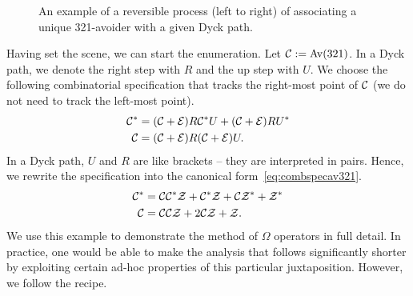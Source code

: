 \documentclass[12pt, a4paper, twoside]{report}
\begin{document}
\begin{figure}[!ht]
\begin{center}
\caption{\small{An example of a reversible process (left to right) of associating a unique 321-avoider with a given Dyck path.}}
\end{center}
\end{figure}

Having set the scene, we can start the enumeration. Let $\mathcal{C} := \mathrm{Av}(321)$. In a Dyck path, we denote the right step with $R$ and the up step with $U$. We choose the following combinatorial specification that tracks the right-most point of $\mathcal{C}$ (we do not need to track the left-most point). 
\begin{align*}
  \mathcal{C}^* &= (\mathcal{C} + \mathcal{E})R\mathcal{C}^*U + (\mathcal{C} + \mathcal{E})RU^*\\
  \mathcal{C} &= (\mathcal{C}+\mathcal{E})R(\mathcal{C}+\mathcal{E})U.
\end{align*}
In a Dyck path, $U$ and $R$ are like brackets -- they are interpreted in pairs. Hence, we rewrite the specification into the canonical form~\eqref{eq:combspecav321}. 
\begin{align}
  \begin{aligned}
  \mathcal{C}^* &= \mathcal{C}\mathcal{C}^*\mathcal{Z} + \mathcal{C}^*\mathcal{Z} + \mathcal{C}\mathcal{Z}^* + \mathcal{Z}^*\\
  \mathcal{C} &= \mathcal{C}\mathcal{C}\mathcal{Z} + 2\mathcal{C}\mathcal{Z} + \mathcal{Z}.
\end{aligned}
       \label{eq:combspecav321}
\end{align}
We use this example to demonstrate the method of $\Omega$ operators in full detail. In practice, one would be able to make the analysis that follows significantly shorter by exploiting certain ad-hoc properties of this particular juxtaposition. However, we follow the recipe.
\end{document}
